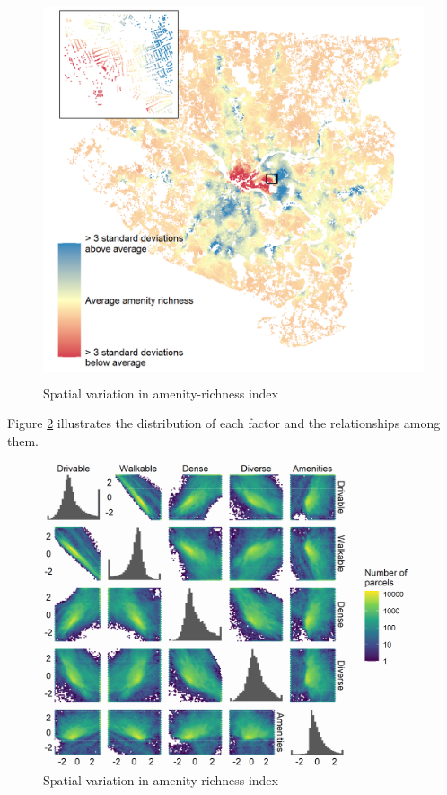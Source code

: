 \documentclass[
]{book}
\begin{document}
\begin{figure}
\includegraphics[width=1\linewidth]{04_figures/amenities} \caption{Spatial variation in amenity-richness index}\label{fig:amenities-map}
\end{figure}

Figure \ref{fig:factor-cor} illustrates the distribution of each factor and the
relationships among them.

\begin{figure}
\includegraphics[width=1\linewidth]{04_figures/factor-cor} \caption{Spatial variation in amenity-richness index}\label{fig:factor-cor}
\end{figure}
\end{document}
